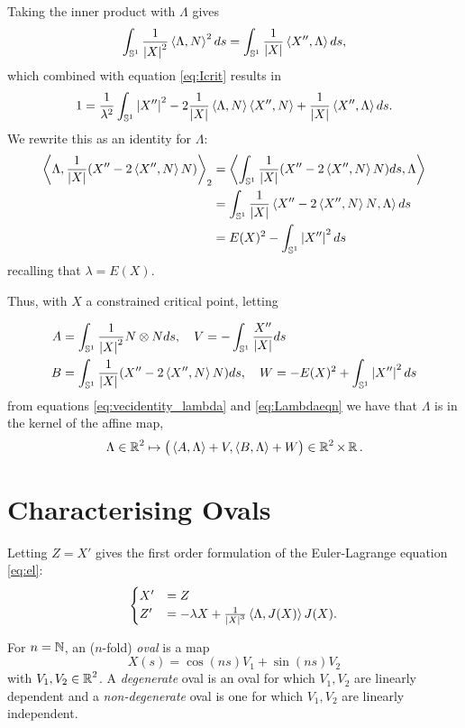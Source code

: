 \documentclass[12pt]{article}
\begin{document}
Taking the inner product with \(\Lambda\) gives
\[
\int_{\operatorname{\mathbb{S}^1}} \frac{1}{\left|{X}\right|^2} \left\langle{\Lambda},{N}\right\rangle^2 ds = \int_{\operatorname{\mathbb{S}^1}} \frac{1}{\left|{X}\right|} \left\langle{X''},{\Lambda}\right\rangle ds,
\]
which combined with equation \eqref{eq:Icrit} results in
\[
1 = \frac{1}{\lambda^2} \int_{\operatorname{\mathbb{S}^1}} \left|{X''}\right|^2 - 2\frac{1}{\left|{X}\right|} \left\langle{\Lambda},{N}\right\rangle\left\langle{X''},{N}\right\rangle +  \frac{1}{\left|{X}\right|} \left\langle{X''},{\Lambda}\right\rangle ds.
\]
We rewrite this as an identity for \(\Lambda\):
\begin{equation}
\label{eq:Lambdaeqn}
\begin{split}
\left\langle{\Lambda},{\frac{1}{\left|{X}\right|} (X'' - 2 \left\langle{X''},{N}\right\rangle N)}\right\rangle_2 &= \left\langle{\int_{\operatorname{\mathbb{S}^1}} \frac{1}{\left|{X}\right|} (X'' - 2 \ensuremath{\left\langle{X''},{N}\right\rangle}N) ds},{\Lambda}\right\rangle \\
&= \int_{\operatorname{\mathbb{S}^1}} \frac{1}{\left|{X}\right|} \left\langle{X'' - 2 \ensuremath{\left\langle{X''},{N}\right\rangle}N},{\Lambda}\right\rangle ds \\
&= E(X)^2 - \int_{\operatorname{\mathbb{S}^1}} \left|{X''}\right|^2 ds
\end{split}
\end{equation}
recalling that \(\lambda = E(X)\).

Thus, with \(X\) a constrained critical point, letting

\begin{align*}
A &= \int_{\operatorname{\mathbb{S}^1}} \frac{1}{\left|{X}\right|^2} N \otimes N ds, \quad V = -\int_{\operatorname{\mathbb{S}^1}} \frac{X''}{\left|{X}\right|} ds \\
B &= \int_{\operatorname{\mathbb{S}^1}} \frac{1}{\left|{X}\right|} (X'' - 2 \left\langle{X''},{N}\right\rangle N) ds, \quad W = -E(X)^2 + \int_{\operatorname{\mathbb{S}^1}} \left|{X''}\right|^2 ds
\end{align*}
from equations \eqref{eq:vecidentity_lambda} and \eqref{eq:Lambdaeqn} we have that \(\Lambda\) is in the kernel of the affine map,
\[
\Lambda \in \operatorname{\mathbb{R}}^2 \mapsto \big(\left\langle{A},{\Lambda}\right\rangle + V, \left\langle{B},{\Lambda}\right\rangle + W\big) \in \operatorname{\mathbb{R}}^2 \times \operatorname{\mathbb{R}}.
\]

\section{Characterising Ovals}
\label{sec:ovals}

Letting \(Z = X'\) gives the first order formulation of the Euler-Lagrange equation \eqref{eq:el}:
\begin{equation}
\label{eq:el_sys}
\begin{cases}
X' &= Z \\
Z' &= -\lambda X + \frac{1}{\left|{X}\right|^3} \left\langle{\Lambda},{J(X)}\right\rangle J(X).
\end{cases}
\end{equation}

\begin{defn}
For \(n = \operatorname{\mathbb{N}}\), an (\(n\)-fold) \emph{oval} is a map
\[
X(s) = \cos(n s) V_1 + \sin(n s) V_2
\]
with \(V_1, V_2 \in \operatorname{\mathbb{R}}^2\). A \emph{degenerate} oval is an oval for which \(V_1, V_2\) are linearly dependent and a \emph{non-degenerate} oval is one for which \(V_1, V_2\) are linearly independent.
\end{defn}
\end{document}
